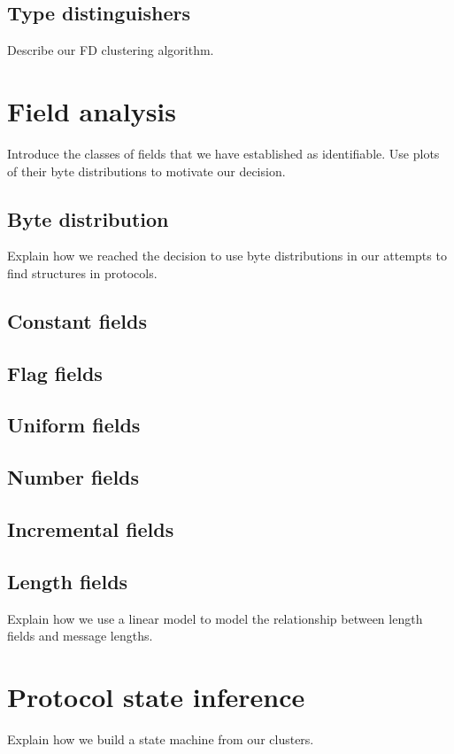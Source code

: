 \documentclass[a4paper]{report}
\begin{document}
\subsection{Type distinguishers}
Describe our FD clustering algorithm.

\section{Field analysis}
Introduce the classes of fields that we have established as identifiable. Use
plots of their byte distributions to motivate our decision.

\subsection{Byte distribution}
Explain how we reached the decision to use byte distributions in our attempts
to find structures in protocols.

\subsection{Constant fields}

\subsection{Flag fields}

\subsection{Uniform fields}

\subsection{Number fields}

\subsection{Incremental fields}

\subsection{Length fields}
Explain how we use a linear model to model the relationship between length
fields and message lengths.

\section{Protocol state inference}
Explain how we build a state machine from our clusters.
\end{document}
